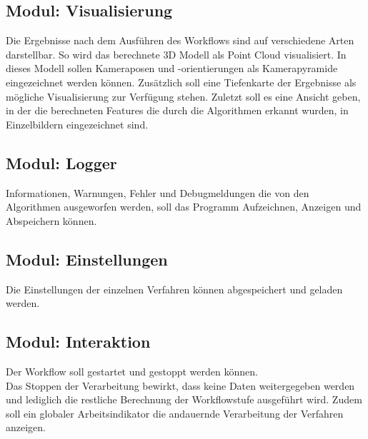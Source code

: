 \subsection{Modul: Visualisierung}
Die Ergebnisse nach dem Ausführen des Workflows sind auf verschiedene Arten darstellbar. So wird das berechnete 3D Modell als Point Cloud visualisiert. In dieses Modell sollen Kameraposen und -orientierungen als Kamerapyramide eingezeichnet werden können. Zusätzlich soll eine Tiefenkarte der Ergebnisse als mögliche Visualisierung zur Verfügung stehen. Zuletzt soll es eine Ansicht geben, in der die berechneten Features die durch die Algorithmen erkannt wurden, in Einzelbildern eingezeichnet sind. 
\subsection{Modul: Logger}
Informationen, Warnungen, Fehler und Debugmeldungen die von den Algorithmen ausgeworfen werden, soll das Programm Aufzeichnen, Anzeigen und Abspeichern können.
\subsection{Modul: Einstellungen}
Die Einstellungen der einzelnen Verfahren können abgespeichert und geladen werden.
\subsection{Modul: Interaktion}
Der Workflow soll gestartet und gestoppt werden können.\\Das Stoppen der Verarbeitung bewirkt, dass keine Daten weitergegeben werden und lediglich die restliche Berechnung der Workflowstufe ausgeführt wird. Zudem soll ein globaler Arbeitsindikator die andauernde Verarbeitung der Verfahren anzeigen.

